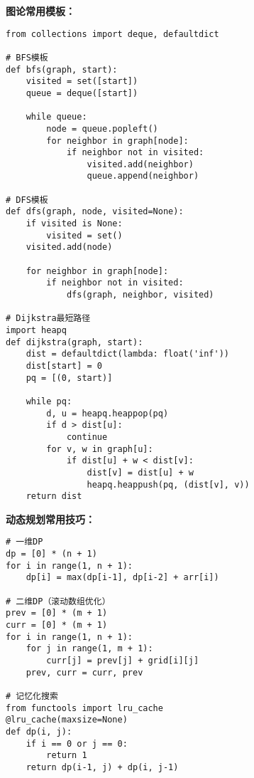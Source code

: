 \documentclass[a4paper,9pt,twocolumn]{ctexart}
\begin{document}
\textbf{图论常用模板：}
\begin{verbatim}
from collections import deque, defaultdict

# BFS模板
def bfs(graph, start):
    visited = set([start])
    queue = deque([start])
    
    while queue:
        node = queue.popleft()
        for neighbor in graph[node]:
            if neighbor not in visited:
                visited.add(neighbor)
                queue.append(neighbor)

# DFS模板
def dfs(graph, node, visited=None):
    if visited is None:
        visited = set()
    visited.add(node)
    
    for neighbor in graph[node]:
        if neighbor not in visited:
            dfs(graph, neighbor, visited)

# Dijkstra最短路径
import heapq
def dijkstra(graph, start):
    dist = defaultdict(lambda: float('inf'))
    dist[start] = 0
    pq = [(0, start)]
    
    while pq:
        d, u = heapq.heappop(pq)
        if d > dist[u]:
            continue
        for v, w in graph[u]:
            if dist[u] + w < dist[v]:
                dist[v] = dist[u] + w
                heapq.heappush(pq, (dist[v], v))
    return dist
\end{verbatim}

\textbf{动态规划常用技巧：}
\begin{verbatim}
# 一维DP
dp = [0] * (n + 1)
for i in range(1, n + 1):
    dp[i] = max(dp[i-1], dp[i-2] + arr[i])

# 二维DP（滚动数组优化）
prev = [0] * (m + 1)
curr = [0] * (m + 1)
for i in range(1, n + 1):
    for j in range(1, m + 1):
        curr[j] = prev[j] + grid[i][j]
    prev, curr = curr, prev

# 记忆化搜索
from functools import lru_cache
@lru_cache(maxsize=None)
def dp(i, j):
    if i == 0 or j == 0:
        return 1
    return dp(i-1, j) + dp(i, j-1)
\end{verbatim}
\end{document}
